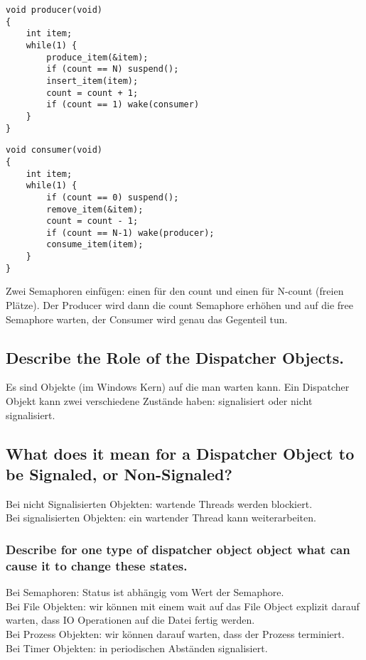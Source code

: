 \begin{minipage}{.5\textwidth}
    \begin{lstlisting}
void producer(void)
{
    int item;
    while(1) {
        produce_item(&item);
        if (count == N) suspend();
        insert_item(item);
        count = count + 1;
        if (count == 1) wake(consumer)
    }
}
    \end{lstlisting}
    \end{minipage}
    \begin{minipage}{.5\textwidth}
    \begin{lstlisting}
void consumer(void)
{
    int item;
    while(1) {
        if (count == 0) suspend();
        remove_item(&item);
        count = count - 1;
        if (count == N-1) wake(producer);
        consume_item(item);
    }
}
    \end{lstlisting}
    \end{minipage}

Zwei Semaphoren einfügen: einen für den count und einen für N-count (freien Plätze).
Der Producer wird dann die count Semaphore erhöhen und auf die free Semaphore warten, der Consumer wird genau das Gegenteil tun.

\subsection{Describe the Role of the Dispatcher Objects.}
Es sind Objekte (im Windows Kern) auf die man warten kann.
Ein Dispatcher Objekt kann zwei verschiedene Zustände haben: signalisiert oder nicht signalisiert.

\subsection{What does it mean for a Dispatcher Object to be Signaled, or Non-Signaled?}
Bei nicht Signalisierten Objekten: wartende Threads werden blockiert.\\
\unsure Bei signalisierten Objekten: ein wartender Thread kann weiterarbeiten.

\subsubsection{Describe for one type of dispatcher object object what can cause it to change these states.}
Bei Semaphoren: Status ist abhängig vom Wert der Semaphore.\\
Bei File Objekten: wir können mit einem wait auf das File Object explizit darauf warten, dass IO Operationen auf die Datei fertig werden.\\
Bei Prozess Objekten: wir können darauf warten, dass der Prozess terminiert.\\
Bei Timer Objekten: in periodischen Abständen signalisiert.

